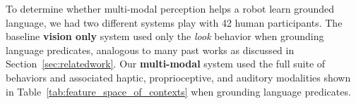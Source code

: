 To determine whether multi-modal perception helps a robot learn grounded language, we had two different systems play \ispy with 42 human participants.
The baseline \textbf{vision only} system used only the \textit{look} behavior when grounding language predicates, analogous to many past works as discussed in Section~\ref{sec:relatedwork}.
Our \textbf{multi-modal} system used the full suite of behaviors and associated haptic, proprioceptive, and auditory modalities shown in Table~\ref{tab:feature_space_of_contexts} when grounding language predicates.